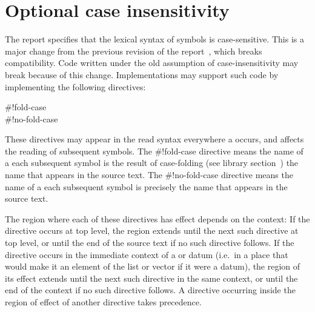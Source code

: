 \chapter{Optional case insensitivity}
\label{caseinsensitivityappendix}

The report specifies that the lexical syntax of symbols is
case-sensitive.  This is a major change from the previous revision of
the report~\cite{R5RS}, which breaks compatibility.  Code written
under the old assumption of case-insensitivity may break because of
this change.  Implementations may support such code by implementing
the following directives:

\begin{entry}{%
{\cf{}\#!fold-case}\\
{\cf{}\#!no-fold-case}}

These directives may appear in the read syntax everywhere a
 occurs, and affects the reading of subsequent symbols.
The {\cf{}\#!fold-case} directive means the name of a each subsequent
symbol is the result of case-folding (see library
section~) the name that appears in the
source text.  The {\cf{}\#!no-fold-case} directive means the name of a each
subsequent symbol is precisely the name that appears in the source text.

The region where each of these directives has effect depends on the
context: If the directive occurs at top level, the region extends
until the next such directive at top level, or until the end of the
source text if no such directive follows.  If the directive occurs in
the immediate context of a  or  datum (i.e.\
in a place that would make it an element of the list or vector if it
were a datum), the region of its effect extends until the next such
directive in the same context, or until the end of the context if no
such directive follows. A directive occurring inside the region of
effect of another directive takes precedence.
\end{entry}

